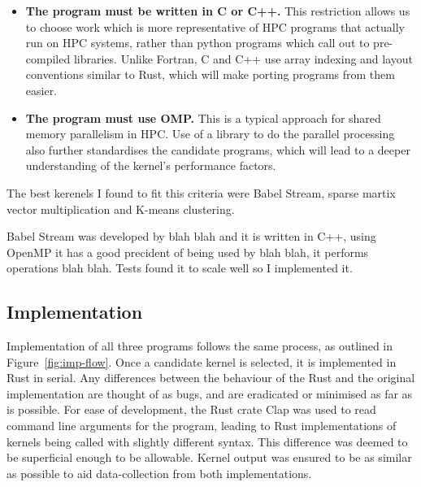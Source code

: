 \begin{itemize}
  \item \textbf{The program must be written in C or C++.} This restriction allows us to choose work which is more representative of HPC programs that actually run on HPC systems, rather than python programs which call out to pre-compiled libraries. Unlike Fortran, C and C++ use array indexing and layout conventions similar to Rust, which will make porting programs from them easier.

  \item \textbf{The program must use OMP.} This is a typical approach for shared memory parallelism in HPC. Use of a library to do the parallel processing also further standardises the candidate programs, which will lead to a deeper understanding of the kernel's performance factors.
\end{itemize}

The best kerenels I found to fit this criteria were Babel Stream, sparse martix vector multiplication and K-means clustering.

Babel Stream was developed by blah blah and it is written in C++, using OpenMP it has a good precident of being used by blah blah, it performs operations blah blah. Tests found it to scale well so I implemented it.

\subsection{Implementation}
Implementation of all three programs follows the same process, as outlined in Figure~\ref{fig:imp-flow}. Once a candidate kernel is selected, it is implemented in Rust in serial. Any differences between the  behaviour of the Rust and the original implementation are thought of as bugs, and are eradicated or minimised as far as is possible. For ease of development, the Rust crate Clap was used to read command line arguments for the program, leading to Rust implementations of kernels being called with slightly different syntax. This difference was deemed to be superficial enough to be allowable. Kernel output was ensured to be as similar as possible to aid data-collection from both implementations.

